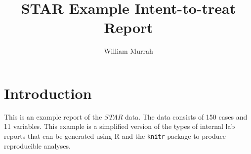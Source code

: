 \documentclass[doc]{apa6}\usepackage[]{graphicx}\usepackage[]{color}
\begin{document}
\author{William Murrah}
\title{STAR Example Intent-to-treat Report}
\maketitle
\tableofcontents







\clearpage
\section{Introduction}

This is an example report of the \emph{STAR} data. The data consists of 150 cases and 11 variables. This example is a simplified version of the types of internal lab reports that can be generated using R and the \texttt{knitr} package to produce reproducible analyses. 
\end{document}
